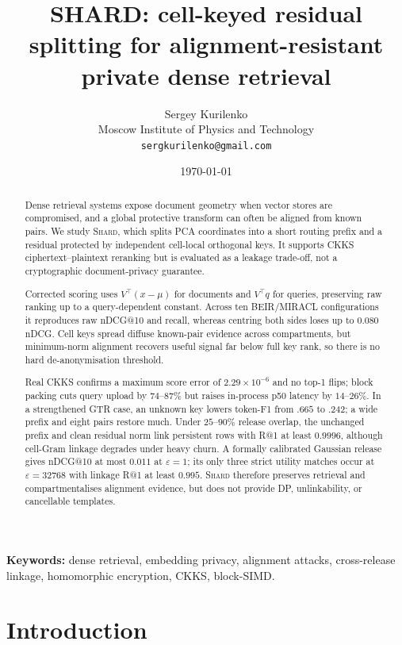 \documentclass[11pt,a4paper]{article}
\title{\textbf{SHARD: cell-keyed residual splitting for
alignment-resistant private dense retrieval}}
\author{Sergey Kurilenko\\
\small Moscow Institute of Physics and Technology\\
\small \texttt{sergkurilenko@gmail.com}}
\date{\today}
\begin{document}
\maketitle

\begin{abstract}
\noindent
Dense retrieval systems expose document geometry when vector stores are
compromised, and a global protective transform can often be aligned from
known pairs. We study \textsc{Shard}, which splits PCA coordinates into a
short routing prefix and a residual protected by independent cell-local
orthogonal keys. It supports CKKS ciphertext--plaintext reranking but is
evaluated as a leakage trade-off, not a cryptographic document-privacy
guarantee.

Corrected scoring uses $V^\top(x-\mu)$ for documents and $V^\top q$ for
queries, preserving raw ranking up to a query-dependent constant. Across ten
BEIR/MIRACL configurations it reproduces raw nDCG@10 and recall, whereas
centring both sides loses up to $0.080$ nDCG. Cell keys spread diffuse
known-pair evidence across compartments, but minimum-norm alignment recovers
useful signal far below full key rank, so there is no hard de-anonymisation
threshold.

Real CKKS confirms a maximum score error of $2.29\times10^{-6}$ and no top-1
flips; block packing cuts query upload by $74$--$87\%$ but raises in-process
p50 latency by $14$--$26\%$. In a strengthened GTR case, an unknown key lowers
token-F1 from $.665$ to $.242$; a wide prefix and eight pairs restore much.
Under $25$--$90\%$ release overlap, the unchanged prefix and clean residual
norm link persistent rows with R@1 at least $0.9996$, although cell-Gram
linkage degrades under heavy churn. A formally calibrated Gaussian release
gives nDCG@10 at most $0.011$ at $\varepsilon=1$; its only three strict
utility matches occur at $\varepsilon=32768$ with linkage R@1 at least
$0.995$. \textsc{Shard} therefore preserves retrieval and compartmentalises
alignment evidence, but does not provide DP, unlinkability, or cancellable
templates.
\end{abstract}

\textbf{Keywords:}
dense retrieval, embedding privacy, alignment attacks, cross-release linkage,
homomorphic encryption, CKKS, block-SIMD.

\section{Introduction}
\end{document}
